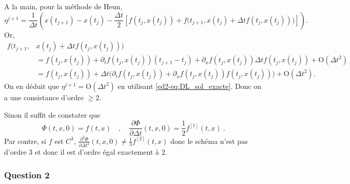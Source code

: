 
A la main, pour la méthode de Heun, \[
\eta^{j+1} = \frac{1}{{\Delta t}}\left( x(t_{j+1}) - x(t_j) - \frac{{\Delta t}}{2}\left[ f(t_j,x(t_j)) + f\Big(t_{j+1},x(t_j)+{\Delta t}f(t_j,x(t_j)) \Big) \right]\right). 
\] Or, \[
\begin{aligned}
f\Big(t_{j+1},&x(t_j)+{\Delta t}f(t_j,x(t_j)) \Big)\\ 
&= f(t_j,x(t_j)) +  \partial_t f(t_j,x(t_j))(t_{j+1}-t_j) + \partial_x f(t_j,x(t_j)) {\Delta t}f(t_j,x(t_j)) + \mathrm{O}({\Delta t}^2)\\
& = f(t_j,x(t_j)) + {\Delta t}\Big( \partial_t f(t_j,x(t_j)) + \partial_x f(t_j,x(t_j)) f(t_j,x(t_j)) \Big) + \mathrm{O}({\Delta t}^2).
\end{aligned}
\] On en déduit que \(\eta^{j+1} = \mathrm{O}({\Delta t}^2)\) en
utilisant \eqref{ed2-eq:DL_sol_exacte}. Donc on a une consistance d'ordre
\(\geq 2\).

Sinon il suffit de constater que \[
\Phi(t,x,0) = f(t,x) \quad ,\quad \frac{\partial \Phi}{\partial {\Delta t}}(t,x,0) = \frac{1}{2} f^{[1]}(t,x)   \ .
\] Par contre, si \(f\) est \(C^3\),
\(\frac{\partial^2 \Phi}{\partial {\Delta t}^2}(t,x,0) \neq \frac{1}{3} f^{[2]}(t,x)\)
donc le schéma n'est pas d'ordre 3 et donc il est d'ordre égal
exactement à 2.

\hypertarget{ed2-answer-consist-2}{%
\subsubsection*{Question 2}\label{ed2-answer-consist-2}}


